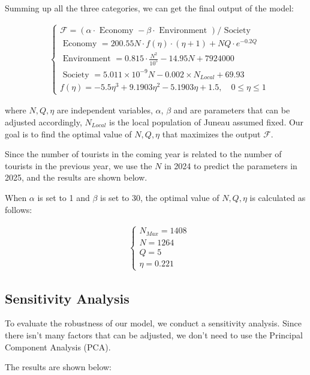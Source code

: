 Summing up all the three categories, we can get the final output of the model:

\begin{equation}
    \begin{aligned}
    &\left\{\begin{array}{l}
    \mathcal{F}=(\alpha \cdot \text { Economy }-\beta \cdot \text { Environment }) / \text { Society } \\[10pt]
    \text { Economy }=200.55 N \cdot f(\eta) \cdot (\eta+1)+NQ\cdot e^{-0.2 Q} \\[10pt]
    \text { Environment }=0.815 \cdot \frac{N^2}{10^5}-14.95 N+7924000 \\[10pt]
    \text { Society }=5.011\times 10^{-9} N -0.002 \times N_{Local}+69.93 \\[10pt]
    f(\eta)=-5.5 \eta^3+9.1903 \eta^2-5.1903 \eta+1.5, \quad 0 \leq \eta \leq 1
    \end{array}\right.
    \end{aligned}
\end{equation}

where $N,Q,\eta$ are independent variables, $\alpha$, $\beta$ 
and are parameters that can be adjusted accordingly, 
$N_{Local}$ is the local population of Juneau assumed fixed.
Our goal is to find the optimal value of $N,Q,\eta$ that maximizes the output $\mathcal{F}$.

Since the number of tourists in the coming year is related to the number of tourists in the previous year, 
we use the $N$ in 2024 to predict the parameters in 2025, and the results are shown below.

When $\alpha$ is set to 1 and $\beta$ is set to 30, 
the optimal value of $N,Q,\eta$ is calculated as follows:

\begin{equation}
    \begin{aligned}
    &\left\{\begin{array}{l}
    N_{Max} = 1408 \\[10pt]
    N=1264 \\[10pt]
    Q=5 \\[10pt]
    \eta=0.221
    \end{array}\right.
    \end{aligned}
\end{equation}

\subsection{Sensitivity Analysis}

To evaluate the robustness of our model, we conduct a sensitivity analysis.
Since there isn't many factors that can be adjusted, we don't need to use the Principal Component Analysis (PCA).

The results are shown below: